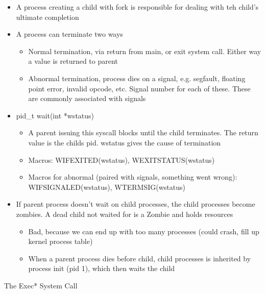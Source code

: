 \begin{itemize}
    \item A process creating a child with fork is responsible for dealing with teh child's ultimate completion
    \item A process can terminate two ways
    \begin{itemize}
        \item Normal termination, via return from main, or exit system call. Either way a value is returned to parent
        \item Abnormal termination, process dies on a signal, e.g. segfault, floating point error, invalid opcode, etc. Signal number for each of these. These are commonly associated with signals
    \end{itemize}
    \item pid\_t wait(int *wstatus)
    \begin{itemize}
        \item A parent issuing this syscall blocks until the child terminates. The return value is the childs pid. wstatus gives the cause of termination
        \item Macros: WIFEXITED(wstatus), WEXITSTATUS(wstatus)
        \item Macros for abnormal (paired with signals, something went wrong): WIFSIGNALED(wstatus), WTERMSIG(wstatus)
    \end{itemize}
    \item If parent process doesn't wait on child processes, the child processes become zombies. A dead child not waited for is a Zombie and holds resources
    \begin{itemize}
        \item Bad, because we can end up with too many processes (could crash, fill up kernel process table)
        \item When a parent process dies before child, child processes is inherited by process init (pid 1), which then waits the child
    \end{itemize}
\end{itemize}
The Exec* System Call

